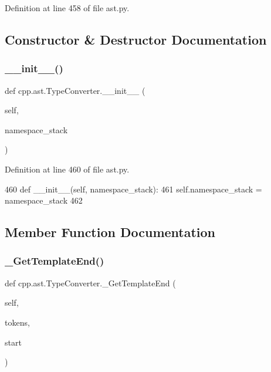 Definition at line 458 of file ast.\+py.



\subsection{Constructor \& Destructor Documentation}
\mbox{\label{classcpp_1_1ast_1_1TypeConverter_ae6e75773d6722cdbb96d510a49cb633a}} 
\subsubsection{\texorpdfstring{\+\_\+\+\_\+init\+\_\+\+\_\+()}{\_\_init\_\_()}}
{\footnotesize\ttfamily def cpp.\+ast.\+Type\+Converter.\+\_\+\+\_\+init\+\_\+\+\_\+ (\begin{DoxyParamCaption}\item[{}]{self,  }\item[{}]{namespace\+\_\+stack }\end{DoxyParamCaption})}



Definition at line 460 of file ast.\+py.


\begin{DoxyCode}
460     \textcolor{keyword}{def }\_\_init\_\_(self, namespace\_stack):
461         self.namespace\_stack = namespace\_stack
462 
\end{DoxyCode}


\subsection{Member Function Documentation}
\mbox{\label{classcpp_1_1ast_1_1TypeConverter_adcf38788abb48f32f4a63eb091b3d53a}} 
\subsubsection{\texorpdfstring{\+\_\+\+Get\+Template\+End()}{\_GetTemplateEnd()}}
{\footnotesize\ttfamily def cpp.\+ast.\+Type\+Converter.\+\_\+\+Get\+Template\+End (\begin{DoxyParamCaption}\item[{}]{self,  }\item[{}]{tokens,  }\item[{}]{start }\end{DoxyParamCaption})\hspace{0.3cm}{\ttfamily [private]}}



